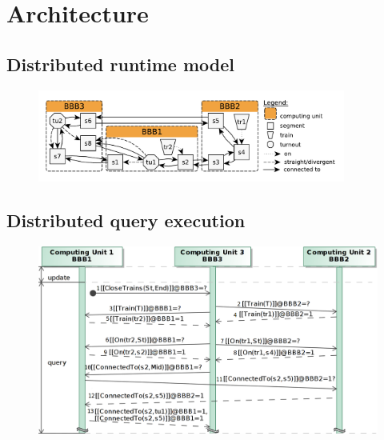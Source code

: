 
\chapter{Architecture}

\section{Distributed runtime model}

\begin{figure}[h]
	\begin{center}
		\includegraphics[width=0.9\textwidth]{figures/runtime-snapshot.pdf}
	\end{center}
\end{figure}


\section{Distributed query execution}

\begin{figure}[h]
	\begin{center}
		\includegraphics[width=1\textwidth]{figures/seq-diagram-query-exec.png}
	\end{center}
\end{figure}